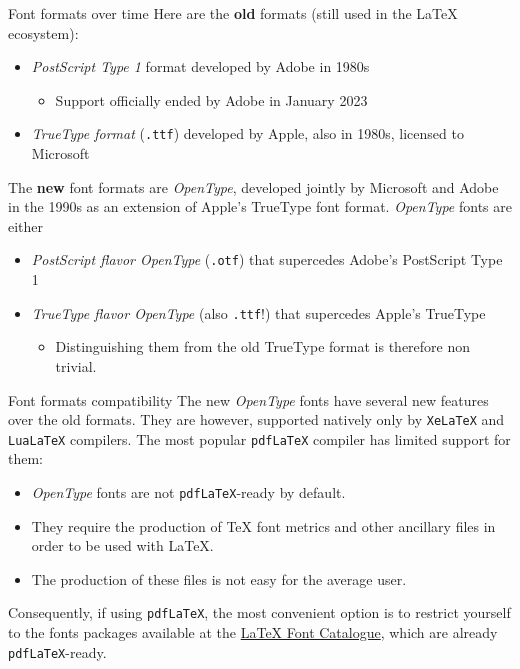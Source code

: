 \documentclass{beamer}
\newcommand{\hrefcol}[2]{\textcolor{uihteal}{\href{#1}{#2}}}
\begin{document}
\begin{frame}[fragile]{Font formats over time}
Here are the \textbf{old} formats (still used in the LaTeX ecosystem):

\begin{itemize}
\item \emph{PostScript Type 1} format developed by Adobe in 1980s
\begin{itemize}
    \item Support officially ended by Adobe in January 2023
\end{itemize}
\item \emph{TrueType format} (\verb|.ttf|) developed by Apple, also in 1980s, licensed to Microsoft
\end{itemize}

The \textbf{new} font formats are \emph{OpenType}, developed jointly by Microsoft and Adobe in the 1990s as an extension of Apple's TrueType font format. \emph{OpenType} fonts are either

\begin{itemize}
\item \emph{PostScript flavor OpenType} (\verb|.otf|) that supercedes Adobe's PostScript Type 1
\item \emph{TrueType flavor OpenType} (also \verb|.ttf|!) that supercedes Apple's TrueType
    \begin{itemize}
    \item Distinguishing them from the old TrueType format is therefore non trivial.
    \end{itemize}
\end{itemize}
\end{frame}


\begin{frame}[fragile]{Font formats compatibility}
The new \emph{OpenType} fonts have several new features over the old formats. They are however, supported natively only by \verb|XeLaTeX| and \verb|LuaLaTeX| compilers. The most popular \verb|pdfLaTeX| compiler has limited support for them:
\begin{itemize}
\item \emph{OpenType} fonts are not \verb|pdfLaTeX|-ready by default.
\item They require the production of TeX font metrics and other ancillary files in order to be used with LaTeX.
\item The production of these files is not easy for the average user.
\end{itemize}
Consequently, if using \verb|pdfLaTeX|, the most convenient option is to restrict yourself to the fonts packages available at the \hrefcol{https://tug.org/FontCatalogue/}{LaTeX Font Catalogue}, which are already \verb|pdfLaTeX|-ready.
\end{frame}
\end{document}
